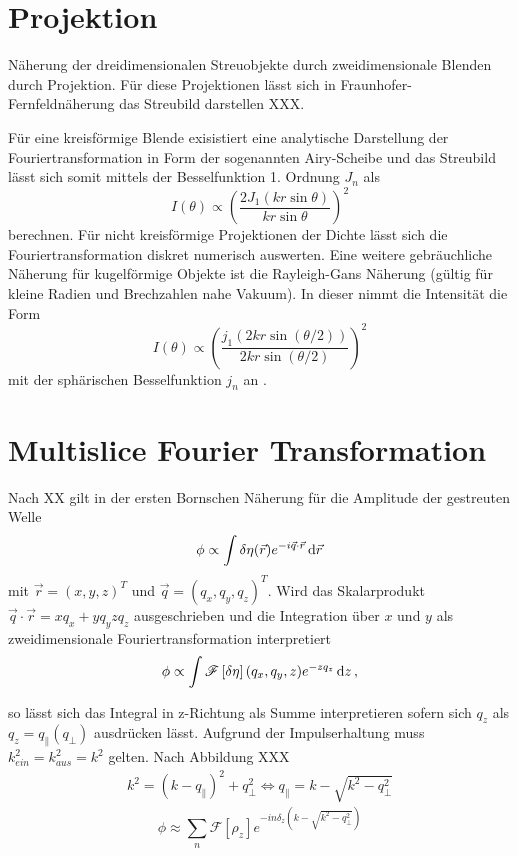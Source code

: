 \section{Projektion}
	Näherung der dreidimensionalen Streuobjekte durch zweidimensionale Blenden durch Projektion. Für diese Projektionen lässt sich in Fraunhofer-Fernfeldnäherung das Streubild darstellen XXX. 
	
	Für eine kreisförmige Blende exisistiert eine analytische Darstellung der Fouriertransformation in Form der sogenannten Airy-Scheibe und das Streubild lässt sich somit mittels der Besselfunktion 1. Ordnung $J_n$ als
	\begin{equation}
	I(\theta) \propto \left ( \frac{2 J_1(kr \sin \theta)}{kr \sin \theta} \right )^2 
	\end{equation}
	berechnen\cite[S. 396]{born1980}. Für nicht kreisförmige Projektionen der Dichte lässt sich die Fouriertransformation diskret numerisch auswerten.
	Eine weitere gebräuchliche Näherung für kugelförmige Objekte ist die Rayleigh-Gans Näherung (gültig für kleine Radien und Brechzahlen nahe Vakuum). In dieser nimmt die Intensität die Form
	\begin{equation}
	    I(\theta)\propto\left ( \frac{j_1(2kr\sin(\theta/2))}{2kr\sin(\theta/2)} \right )^2 
	\end{equation}
	mit der sphärischen Besselfunktion $j_n$ an \cite[S. 163]{bohren2008}. 


\section{Multislice Fourier Transformation}
	Nach XX gilt in der ersten Bornschen Näherung für die Amplitude der gestreuten Welle
	\begin{equation}
		\phi\propto\int \delta\eta(\vec{r}) e^{-i\vec{q}\cdot \vec{r}} \dif \vec{r}
	\end{equation}
	mit $\vec{r}=(x,y,z)^T$ und  $\vec{q}=(q_x,q_y,q_z)^T$. Wird das Skalarprodukt $\vec{q}\cdot \vec{r}=xq_x+yq_yzq_z$ ausgeschrieben und die Integration über $x$ und $y$ als zweidimensionale Fouriertransformation interpretiert
	\begin{equation}
	\phi\propto\int \mathscr{F}\left[\delta\eta\right](q_x,q_y,z) e^{-zq_z} \dif z \, ,
	\end{equation}

	so lässt sich das Integral in z-Richtung als Summe interpretieren sofern sich $q_z$ als $q_z=q_\parallel(q_\perp)$ ausdrücken lässt.
	Aufgrund der Impulserhaltung muss $k_{ein}^2=k_{aus}^2=k^2$ gelten. Nach Abbildung XXX 
	\begin{align}
	k^2=(k-q_\parallel)^2+q_{\perp}^2
	\Leftrightarrow q_\parallel=k-\sqrt{k^2-q_\perp^2}
	\end{align}
	\begin{equation}
	\phi\approx\sum_n{\mathscr{F}\left[\rho_z\right] e^{-in\delta_z\left(k-\sqrt{k^2-q_\perp^2}\right) }}
	\end{equation}

